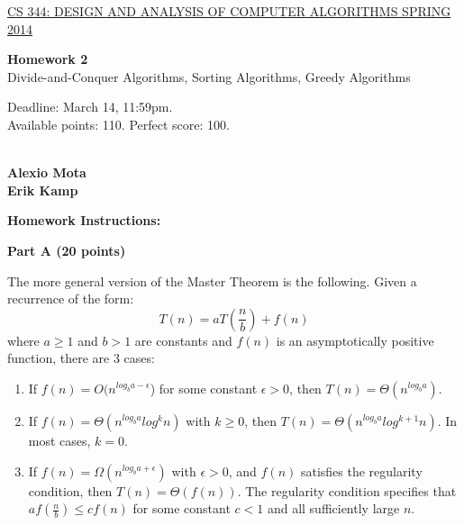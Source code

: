 \documentclass{article}
\begin{document}
\sloppy

\noindent \underline{CS 344: DESIGN AND ANALYSIS OF COMPUTER
  ALGORITHMS \hspace{1.6in} SPRING 2014}

\vspace{0.1in}

\begin{center}
{\bf {\large Homework 2}}\\
Divide-and-Conquer Algorithms, Sorting Algorithms, Greedy Algorithms\\
\end{center}

\vspace{0.1in}

\noindent Deadline: March 14, 11:59pm.\\ 
Available points: 110. Perfect score: 100.\\

\vspace{0.1in}

\\
{\bf {\large Alexio Mota}}\\
{\bf {\large Erik Kamp}}\\

\begin{center}
{\bf Homework Instructions:}
\end{center}

\vspace{0.1in}

{\bf }

\begin{center}
{\bf Part A (20 points)}
\end{center}

 The more general version of the Master
Theorem is the following. Given a recurrence of the form: 
$$T(n) = a T(\frac{n}{b}) + f(n)$$
where $a \geq 1$ and $b > 1$ are constants and $f(n)$ is an
asymptotically positive function, there are 3 cases: 
\begin{enumerate}
\item If $f(n) = O(n^{log_ba - \epsilon}$) for some constant $\epsilon
  > 0$, then $T(n) = \Theta(n^{log_ba})$.
\item If $f(n) = \Theta(n^{log_ba} log^kn)$ with $k \geq 0$, then
  $T(n) = \Theta(n^{log_ba} log^{k+1}n)$. In most cases, $k = 0$.
\item If $f(n) = \Omega(n^{log_ba+\epsilon})$ with $\epsilon > 0$, and
  $f(n)$ satisfies the regularity condition, then $T(n) = \Theta( f(n)
  )$. The regularity condition specifies that $a f(\frac{n}{b}) \leq c
  f(n)$ for some constant $c < 1$ and all sufficiently large $n$.
\end{enumerate}
\end{document}
